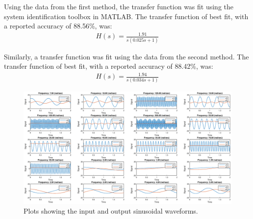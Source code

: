 \documentclass{article}
\begin{document}
Using the data from the first method, the transfer function was fit using the system identification toolbox in MATLAB. The transfer function of best fit, with a reported accuracy of 88.56\%, was:
\begin{align}
H(s) = \frac{1.91}{s(0.025s + 1)}
\end{align}

Similarly, a transfer function was fit using the data from the second method. The transfer function of best fit, with a reported accuracy of 88.42\%, was:
\begin{align}
H(s) = \frac{1.94}{s(0.034s + 1)}
\end{align}

\begin{figure}[H]
	\hspace{-3.5cm}
	\includegraphics[scale=0.45]{fig1}
	\caption{Plots showing the input and output sinusoidal waveforms.}
\end{figure}
\end{document}
